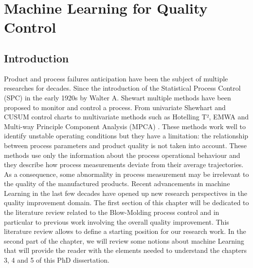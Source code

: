 \chapter{Machine Learning for Quality Control} \label{Machine Learning for Quality Control}
\minitoc

\section{Introduction}


Product and process failures anticipation have been the subject of multiple researches for decades. Since the introduction of the Statistical Process Control (SPC) in the early 1920s by Walter A. Shewart multiple methods have been proposed to monitor and control a process. From univariate Shewhart and  CUSUM \citep{woodall1985multivariate} \citep{crosier1988multivariate} control charts to multivariate methods such as Hotelling T², EMWA \citep{lowry1992multivariate} and Multi-way Principle Component Analysis (MPCA) \citep{nomikos1994monitoring}. These methods work well to identify unstable operating conditions but they have a limitation: the relationship between process parameters and product quality is not taken into account. These methods use only the information about the process operational behaviour and they describe how process measurements deviate from their average trajectories. As a consequence, some abnormality in process measurement may be irrelevant to the quality of the manufactured products. Recent advancements in machine Learning in the last few decades have opened up new research perspectives in the quality improvement domain. The first section of this chapter will be dedicated to the literature review related to the Blow-Molding process control and in particular to previous work involving the overall quality improvement. This literature review allows to define a starting position for our research work. In the second part of the chapter, we will review some notions about machine Learning that will provide the reader with the elements needed to understand the chapters 3, 4 and 5 of this PhD dissertation. 


